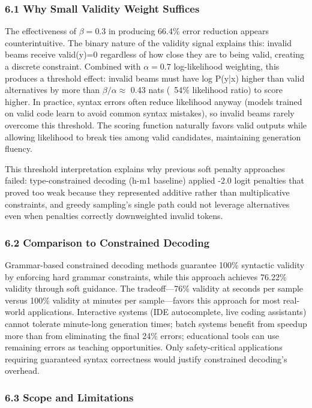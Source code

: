
\subsubsection{6.1 Why Small Validity Weight Suffices}

The effectiveness of $\beta =0.3$ in producing 66.4\% error reduction appears counterintuitive. The binary nature of the validity signal explains this: invalid beams receive valid(y)=0 regardless of how close they are to being valid, creating a discrete constraint. Combined with $\alpha =0.7$ log-likelihood weighting, this produces a threshold effect: invalid beams must have log P(y|x) higher than valid alternatives by more than $\beta /\alpha \approx$ 0.43 nats (~54\% likelihood ratio) to score higher. In practice, syntax errors often reduce likelihood anyway (models trained on valid code learn to avoid common syntax mistakes), so invalid beams rarely overcome this threshold. The scoring function naturally favors valid outputs while allowing likelihood to break ties among valid candidates, maintaining generation fluency.

This threshold interpretation explains why previous soft penalty approaches failed: type-constrained decoding (h-m1 baseline) applied -2.0 logit penalties that proved too weak because they represented additive rather than multiplicative constraints, and greedy sampling's single path could not leverage alternatives even when penalties correctly downweighted invalid tokens.

\subsubsection{6.2 Comparison to Constrained Decoding}

Grammar-based constrained decoding methods guarantee 100\% syntactic validity by enforcing hard grammar constraints, while this approach achieves 76.22\% validity through soft guidance. The tradeoff---76\% validity at seconds per sample versus 100\% validity at minutes per sample---favors this approach for most real-world applications. Interactive systems (IDE autocomplete, live coding assistants) cannot tolerate minute-long generation times; batch systems benefit from speedup more than from eliminating the final 24\% errors; educational tools can use remaining errors as teaching opportunities. Only safety-critical applications requiring guaranteed syntax correctness would justify constrained decoding's overhead.

\subsubsection{6.3 Scope and Limitations}

